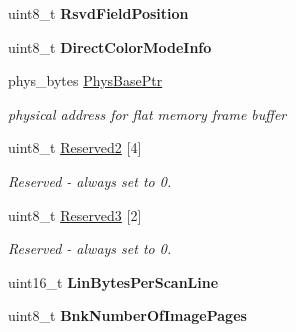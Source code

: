 \begin{DoxyCompactItemize}
\item 
\hypertarget{struct____attribute_____aa357b085181776f2918a6df25c88846b}{uint8\-\_\-t {\bfseries Rsvd\-Field\-Position}}\label{struct____attribute_____aa357b085181776f2918a6df25c88846b}

\item 
\hypertarget{struct____attribute_____a3bf2fd2394ec8649ec3d26104be35dd7}{uint8\-\_\-t {\bfseries Direct\-Color\-Mode\-Info}}\label{struct____attribute_____a3bf2fd2394ec8649ec3d26104be35dd7}

\item 
\hypertarget{struct____attribute_____a1d11f4921094db253fc2c2ee6fbb2afb}{phys\-\_\-bytes \hyperlink{struct____attribute_____a1d11f4921094db253fc2c2ee6fbb2afb}{Phys\-Base\-Ptr}}\label{struct____attribute_____a1d11f4921094db253fc2c2ee6fbb2afb}

\begin{DoxyCompactList}\small\item\em physical address for flat memory frame buffer \end{DoxyCompactList}\item 
\hypertarget{struct____attribute_____a09b5824ec5c67bee2a4b36c0ab5181bc}{uint8\-\_\-t \hyperlink{struct____attribute_____a09b5824ec5c67bee2a4b36c0ab5181bc}{Reserved2} \mbox{[}4\mbox{]}}\label{struct____attribute_____a09b5824ec5c67bee2a4b36c0ab5181bc}

\begin{DoxyCompactList}\small\item\em Reserved -\/ always set to 0. \end{DoxyCompactList}\item 
\hypertarget{struct____attribute_____a2455a82e0d8cc0e8d76e8cf77a68bd39}{uint8\-\_\-t \hyperlink{struct____attribute_____a2455a82e0d8cc0e8d76e8cf77a68bd39}{Reserved3} \mbox{[}2\mbox{]}}\label{struct____attribute_____a2455a82e0d8cc0e8d76e8cf77a68bd39}

\begin{DoxyCompactList}\small\item\em Reserved -\/ always set to 0. \end{DoxyCompactList}\item 
\hypertarget{struct____attribute_____a53c5060b6ac14a7418ca8421edfb9981}{uint16\-\_\-t {\bfseries Lin\-Bytes\-Per\-Scan\-Line}}\label{struct____attribute_____a53c5060b6ac14a7418ca8421edfb9981}

\item 
\hypertarget{struct____attribute_____a33ba903e149724b1bc99b3b8e43a7cbe}{uint8\-\_\-t {\bfseries Bnk\-Number\-Of\-Image\-Pages}}\label{struct____attribute_____a33ba903e149724b1bc99b3b8e43a7cbe}


\end{DoxyCompactItemize}
